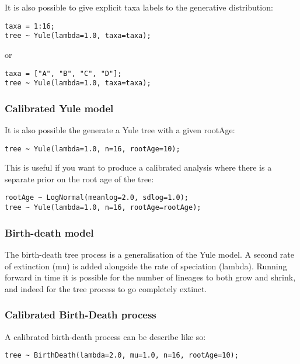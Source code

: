 \documentclass[oneside]{article}
\begin{document}
It is also possible to give explicit taxa labels to the generative distribution:

\begin{verbatim}
taxa = 1:16;
tree ~ Yule(lambda=1.0, taxa=taxa);
\end{verbatim}

or

\begin{verbatim}
taxa = ["A", "B", "C", "D"];
tree ~ Yule(lambda=1.0, taxa=taxa);
\end{verbatim}

\subsubsection{Calibrated Yule model}

It is also possible the generate a Yule tree with a given rootAge:

\begin{verbatim}
tree ~ Yule(lambda=1.0, n=16, rootAge=10);
\end{verbatim}

This is useful if you want to produce a calibrated analysis where there is a separate prior on the root age of the tree:

\begin{verbatim}
rootAge ~ LogNormal(meanlog=2.0, sdlog=1.0);
tree ~ Yule(lambda=1.0, n=16, rootAge=rootAge);
\end{verbatim}

\subsubsection{Birth-death model}

The birth-death tree process is a generalisation of the Yule model. A second rate of extinction (mu) is added alongside
the rate of speciation (lambda). Running forward in time it is possible for the number of lineages to both grow and 
shrink, and indeed for the tree process to go completely extinct. 

\subsubsection{Calibrated Birth-Death process}

A calibrated birth-death process can be describe like so:

\begin{verbatim}
tree ~ BirthDeath(lambda=2.0, mu=1.0, n=16, rootAge=10);
\end{verbatim}
\end{document}
